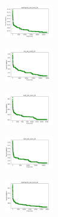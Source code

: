 \begin{figure}[H]
\begin{subfigure}
    \end{subfigure}
    \hfill
    \begin{subfigure}
        \centering
        \includegraphics[width=0.234\textwidth]{img/hs/newthyroid_set_const_20_277451237_cost.png}
    \end{subfigure}
    \hfill
    \begin{subfigure}
        \centering
        \includegraphics[width=0.234\textwidth]{img/hs/iris_set_const_20_49258669_cost.png}
    \end{subfigure}
    \hfill
    \begin{subfigure}
        \centering
        \includegraphics[width=0.234\textwidth]{img/hs/ecoli_set_const_20_49258669_cost.png}
    \end{subfigure}
    \hfill
    \begin{subfigure}
        \centering
        \includegraphics[width=0.234\textwidth]{img/hs/rand_set_const_20_49258669_cost.png}
    \end{subfigure}
    \hfill
    \begin{subfigure}
        \centering
        \includegraphics[width=0.234\textwidth]{img/hs/newthyroid_set_const_20_49258669_cost.png}
    \end{subfigure}
    \hfill
    \begin{subfigure}

\end{subfigure}
\end{figure}
